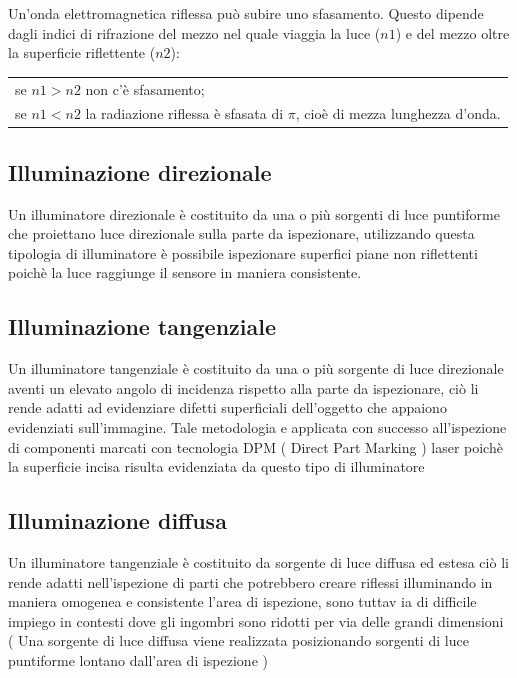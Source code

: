 Un'onda elettromagnetica riflessa può subire uno sfasamento. Questo dipende dagli indici di rifrazione del mezzo nel quale viaggia la luce ($n1$) e del mezzo oltre la superficie riflettente ($n2$):

\begin{tabular}{l}
se $n1>n2$ non c'è sfasamento;\\
se $n1<n2$ la radiazione riflessa è sfasata di $\pi$, cioè di mezza lunghezza d'onda.\\
\end{tabular}

\subsection{Illuminazione direzionale}

Un illuminatore direzionale è costituito da una o più 
sorgenti di luce puntiforme che proiettano luce direzionale 
sulla parte da ispezionare, utilizzando questa tipologia di 
illuminatore è possibile ispezionare superfici piane non 
riflettenti poichè la luce raggiunge il sensore in maniera 
consistente. 

\subsection{Illuminazione tangenziale}

Un illuminatore tangenziale è costituito da una o più 
sorgente di luce direzionale aventi un elevato angolo di 
incidenza rispetto alla parte da ispezionare, ciò li rende 
adatti ad evidenziare difetti superficiali dell’oggetto che 
appaiono evidenziati sull’immagine.  
Tale metodologia e applicata con successo all’ispezione di 
componenti marcati con tecnologia DPM ( Direct Part 
Marking ) laser poichè la superficie incisa risulta evidenziata 
da questo tipo di illuminatore 

\subsection{Illuminazione diffusa}
Un illuminatore tangenziale è costituito da sorgente di luce 
diffusa ed estesa ciò li rende adatti nell’ispezione di parti 
che potrebbero creare riflessi illuminando in maniera 
omogenea e consistente l’area di ispezione, sono tuttav ia 
di difficile impiego in contesti dove gli ingombri sono 
ridotti per via delle grandi dimensioni ( Una sorgente di 
luce diffusa viene realizzata posizionando sorgenti di luce 
puntiforme lontano dall’area di ispezione )  
 
